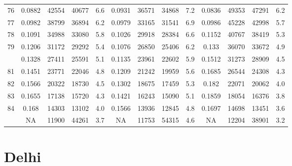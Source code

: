 \documentclass[
  14pt,
]{article}
\begin{document}
\begin{longtable}[t]{lcccccccccccc}
76 & 0.0882 & 42554 & 40677 & 6.6 & 0.0931 & 36571 & 34868 & 7.2 & 0.0836 & 49353 & 47291 & 6.2\\
77 & 0.0982 & 38799 & 36894 & 6.2 & 0.0979 & 33165 & 31541 & 6.9 & 0.0986 & 45228 & 42998 & 5.7\\
78 & 0.1091 & 34988 & 33080 & 5.8 & 0.1026 & 29918 & 28384 & 6.6 & 0.1152 & 40767 & 38419 & 5.3\\
79 & 0.1206 & 31172 & 29292 & 5.4 & 0.1076 & 26850 & 25406 & 6.2 & 0.133 & 36070 & 33672 & 4.9\\
\addlinespace
80 & 0.1328 & 27411 & 25591 & 5.1 & 0.1135 & 23961 & 22602 & 5.9 & 0.1512 & 31273 & 28909 & 4.5\\
81 & 0.1451 & 23771 & 22046 & 4.8 & 0.1209 & 21242 & 19959 & 5.6 & 0.1685 & 26544 & 24308 & 4.3\\
82 & 0.1566 & 20322 & 18730 & 4.5 & 0.1302 & 18675 & 17459 & 5.3 & 0.182 & 22071 & 20062 & 4.0\\
83 & 0.1655 & 17138 & 15720 & 4.3 & 0.1421 & 16243 & 15090 & 5.1 & 0.1859 & 18054 & 16376 & 3.8\\
84 & 0.168 & 14303 & 13102 & 4.0 & 0.1566 & 13936 & 12845 & 4.8 & 0.1697 & 14698 & 13451 & 3.6\\
\addlinespace
85 & NA & 11900 & 44261 & 3.7 & NA & 11753 & 54315 & 4.6 & NA & 12204 & 38901 & 3.2\\*
\end{longtable}

\pagebreak

\hypertarget{delhi}{%
\section{Delhi}\label{delhi}}
\end{document}
